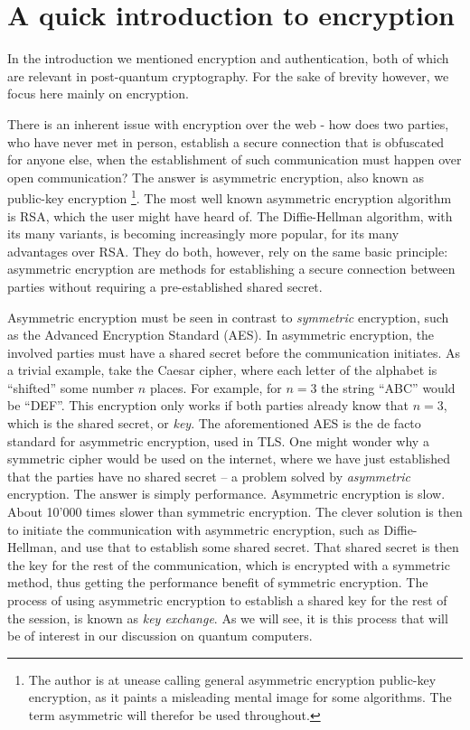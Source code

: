 \documentclass[conference]{IEEEtran}
\begin{document}
\section{A quick introduction to encryption}
In the introduction we mentioned encryption and authentication, both of which are relevant in post-quantum cryptography.
For the sake of brevity however, we focus here mainly on encryption.

There is an inherent issue with encryption over the web - how does two parties, who have never met in person, establish a secure connection that is obfuscated for anyone else, when the establishment of such communication must happen over open communication?
The answer is asymmetric encryption, also known as public-key encryption
\footnote{The author is at unease calling general asymmetric encryption public-key encryption, as it paints a misleading mental image for some algorithms. The term asymmetric will therefor be used throughout.}.
The most well known asymmetric encryption algorithm is RSA, which the user might have heard of.
The Diffie-Hellman algorithm, with its many variants, is becoming increasingly more popular, for its many advantages over RSA.
They do both, however, rely on the same basic principle: asymmetric encryption are methods for establishing a secure connection between parties without requiring a pre-established shared secret.

Asymmetric encryption must be seen in contrast to \emph{symmetric} encryption, such as the Advanced Encryption Standard (AES).
In asymmetric encryption, the involved parties must have a shared secret before the communication initiates.
As a trivial example, take the Caesar cipher, where each letter of the alphabet is ``shifted'' some number $n$ places.
For example, for $n=3$ the string ``ABC'' would be ``DEF''.
This encryption only works if both parties already know that $n=3$, which is the shared secret, or \emph{key}.
The aforementioned AES is the de facto standard for asymmetric encryption, used in TLS.
One might wonder why a symmetric cipher would be used on the internet, where we have just established that the parties have no shared secret -- a problem solved by \emph{asymmetric} encryption.
The answer is simply performance.
Asymmetric encryption is slow.
About 10'000 times slower than symmetric encryption.
The clever solution is then to initiate the communication with asymmetric encryption, such as Diffie-Hellman, and use that to establish some shared secret.
That shared secret is then the key for the rest of the communication, which is encrypted with a symmetric method, thus getting the performance benefit of symmetric encryption.
The process of using asymmetric encryption to establish a shared key for the rest of the session, is known as \emph{key exchange}.
As we will see, it is this process that will be of interest in our discussion on quantum computers.
\end{document}
